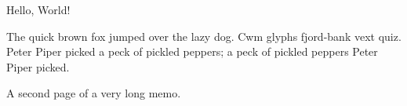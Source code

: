 \documentclass{gsmemo}
\begin{document}
\maketitle

Hello, World!

The quick brown fox jumped over the lazy dog.  Cwm glyphs fjord-bank
vext quiz.  Peter Piper picked a peck of pickled peppers; a peck of
pickled peppers Peter Piper picked.

\clearpage

A second page of a very long memo.
\end{document}
